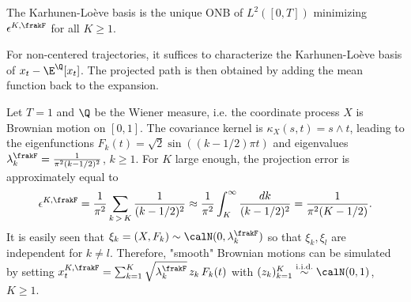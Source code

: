 \begin{theorem}
\label{thm:KL}
The Karhunen-Loève basis
is the unique ONB of $L^2([0,T])$ minimizing $\epsilon^{K,\frakF}$  for all  $K \ge 1$. 
\end{theorem}

\begin{remark}\label{rem:center}
For non-centered trajectories,  it suffices to characterize the Karhunen-Loève basis of $x_t-\E^{\Q}[x_t]$. The projected path is then obtained by  adding the mean function back to the expansion. 
\end{remark}

\begin{example} \label{ex:KLBM} Let $T=1$ and $\Q$ be the Wiener measure, i.e. the coordinate process $X$ is Brownian motion on $[0,1]$. 
The covariance kernel is  $\kappa_X(s,t) = s \wedge t$, leading  to the eigenfunctions $F_k(t) = \sqrt{2} \sin((k-1/2)\pi t)$ and eigenvalues $\lambda_k^{\frakF} = \frac{1}{\pi^2(k-1/2)^2}$, $k \ge 1.$  
For $K$ large enough, the projection error is approximately equal to 
\begin{align*}
    \epsilon^{K,\frakF}
    = \frac{1}{\pi^2}\sum_{k\,>\,K} \frac{1}{(k-1/2)^2}
    \approx \frac{1}{\pi^2} \int_K^{\infty} \frac{dk}{(k-1/2)^2} = 
    \frac{1}{\pi^2(K-1/2)}.
\end{align*}
It is easily seen that $\xi_k = (X,F_k) \sim \calN(0,\lambda_k^{\frakF})$ so that $\xi_k, \xi_l$ are independent for $k\ne l$.  Therefore, "smooth" Brownian motions can be simulated  by setting
$x^{K,\frakF}_t = \sum_{k =1}^K \sqrt{\lambda_k^{\frakF}}\, z_k \, F_k(t)$ with  $(z_k)_{k=1}^K \overset{\textnormal{i.i.d.}}{\sim} \calN(0,1)$, $K\ge 1.$
\end{example}

